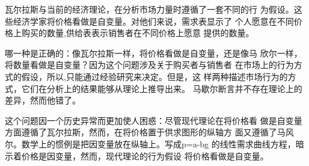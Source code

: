 瓦尔拉斯与当前的经济理论，在分析市场力量时遵循了一套不同的行
为假设。这些经济学家将价格看做是自变量。对他们来说，需求表显示了
个人愿意在不同价格上购买的数量,供给表表示销售者在不同价格上愿意
提供的数量。

哪一种是正确的：像瓦尔拉斯一样，将价格看做是自变量，还是像马
欣尔一样，将数量看做是自变量？因为这个问题涉及关于购买者与销售者
在市场上的行为方式的假设，所以,只能通过经验研究来决定。但是，这
样两种描述市场行为的方式，它们在分析上的结果能够从理论上推导出来。
马歇尔断言并不存在理论上的差异，然而他错了。

这个问题因一个历史异常而更加使人困惑：尽管现代理论在将价格看
做是自变量方面遵循了瓦尔拉斯，然而，在将价格置于供求图形的纵轴方
面又遵循了马风尔。数学上的惯例是把因变量放在纵轴上。写成p=a-bg
的线性需求曲线方程，暗示着价格是因变量，然而，现代理论的行为假设
将价格看做是自变量。



